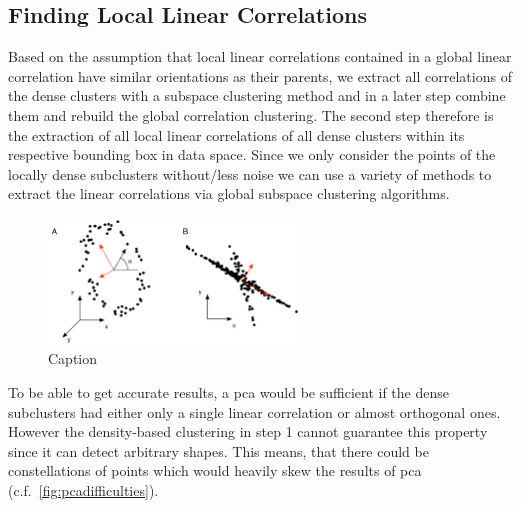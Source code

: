 \subsection{Finding Local Linear Correlations}\label{ssec:findinglocals}
Based on the assumption that local linear correlations contained in a global linear correlation have similar orientations as their parents, we extract all correlations of the dense clusters with a subspace clustering method and in a later step combine them and rebuild the global correlation clustering. The second step therefore is the extraction of all local linear correlations of all dense clusters within its respective bounding box in data space. Since we only consider the points of the locally dense subclusters without/less noise we can use a variety of methods to extract the linear correlations via global subspace clustering algorithms. 

\begin{figure}
    \centering
    \includegraphics[width=0.6\textwidth]{figures/PCAdifficulties.png}
    \caption{Caption\cite{PCAshlens2014tutorial}}
    \label{fig:pcadifficulties}
\end{figure}

To be able to get accurate results, a \gls{pca} would be sufficient if the dense subclusters had either only a single linear correlation or almost orthogonal ones. However the density-based clustering in step 1 cannot guarantee this property since it can detect arbitrary shapes. This means, that there could be constellations of points which would heavily skew the results of \gls{pca} (c.f.~\autoref{fig:pcadifficulties})\cite{PCAshlens2014tutorial}. 

